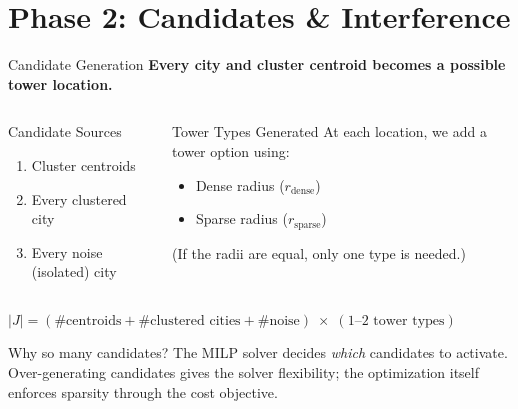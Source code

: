 \section[Candidates \& Interference]{Phase 2: Candidates \& Interference}

\begin{frame}[t]{Candidate Generation}{}
    \textbf{Every city and cluster centroid becomes a possible tower location.}

    \vspace{0.2cm}
    \begin{columns}[T]
        \begin{block}{Candidate Sources}
            \begin{enumerate}
                \item Cluster centroids
                \item Every clustered city
                \item Every noise (isolated) city
            \end{enumerate}
        \end{block}

        \begin{block}{Tower Types Generated}
            At each location, we add a tower option using:
            \begin{itemize}
                \item \alert{Dense radius} ($r_{\text{dense}}$)
                \item \alert{Sparse radius} ($r_{\text{sparse}}$)
            \end{itemize}
            {\footnotesize (If the radii are equal, only one type is needed.)}
        \end{block}
    \end{columns}

    \vspace{0.2cm}
    \begin{center}
        \small
        $|J| = (\text{\# centroids} + \text{\# clustered cities} + \text{\# noise}) \;\times\; (1\text{--}2 \text{ tower types})$
    \end{center}

    \vspace{0.1cm}
    \begin{alertblock}{Why so many candidates?}
        The MILP solver decides \emph{which} candidates to activate. Over-generating candidates gives the solver flexibility; the optimization itself enforces sparsity through the cost objective.
    \end{alertblock}
\end{frame}

